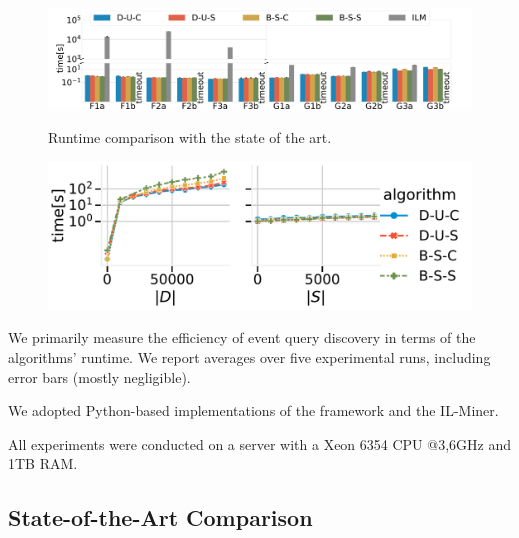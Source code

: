 \begin{figure}
	\centering
	\begin{minipage}[c]{0.64\textwidth}
		\includegraphics[clip, trim=1em 0em 1em 1em,
		width=1\textwidth]{img/sota_4_broken_new.pdf}
		\vspace{-1.5em}
		\caption{Runtime comparison with the state of the art.}

	\label{fig:sota}
\end{minipage}
\begin{minipage}[c]{0.35\textwidth}
	\vspace{2em}

	\includegraphics[clip, trim=1em 0em 1em 1em,
	width=1\textwidth]{img/scalability_plots.pdf}
	\vspace{-1.7em}
	\caption{}
	\label{fig:scale_plots}
\end{minipage}
\vspace{-1em}
\end{figure}

 We primarily measure the efficiency of event query
discovery in terms of the algorithms' runtime. We report averages over five
experimental runs, including error bars (mostly negligible).

We adopted Python-based implementations of the \sys{} framework and the
IL-Miner.

All experiments were conducted on a server with a Xeon 6354 CPU @3,6GHz and
1TB RAM.
\subsection{State-of-the-Art Comparison}
\label{sec:exp_sota}




